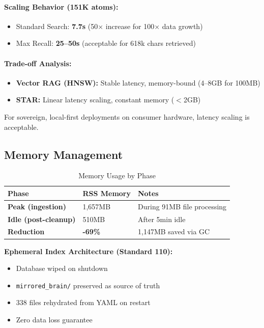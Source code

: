\documentclass[11pt]{article}
\begin{document}
\paragraph{Scaling Behavior (151K atoms):}
\begin{itemize}
    \item Standard Search: \textbf{7.7s} (50$\times$ increase for 100$\times$ data growth)
    \item Max Recall: \textbf{25--50s} (acceptable for 618k chars retrieved)
\end{itemize}

\paragraph{Trade-off Analysis:}
\begin{itemize}
    \item \textbf{Vector RAG (HNSW):} Stable latency, memory-bound (4--8GB for 100MB)
    \item \textbf{STAR:} Linear latency scaling, constant memory ($<$2GB)
\end{itemize}

For sovereign, local-first deployments on consumer hardware, latency scaling is acceptable.

\subsection{Memory Management}

\begin{table}[h]
\centering
\caption{Memory Usage by Phase}
\label{tab:memory}
\begin{tabular}{@{}lll@{}}
\toprule
\textbf{Phase} & \textbf{RSS Memory} & \textbf{Notes} \\ \midrule
\textbf{Peak (ingestion)} & 1,657MB & During 91MB file processing \\
\textbf{Idle (post-cleanup)} & 510MB & After 5min idle \\
\textbf{Reduction} & \textbf{-69\%} & 1,147MB saved via GC \\ \bottomrule
\end{tabular}
\end{table}

\textbf{Ephemeral Index Architecture (Standard 110):}
\begin{itemize}
    \item Database wiped on shutdown
    \item \texttt{mirrored\_brain/} preserved as source of truth
    \item 338 files rehydrated from YAML on restart
    \item Zero data loss guarantee
\end{itemize}
\end{document}
